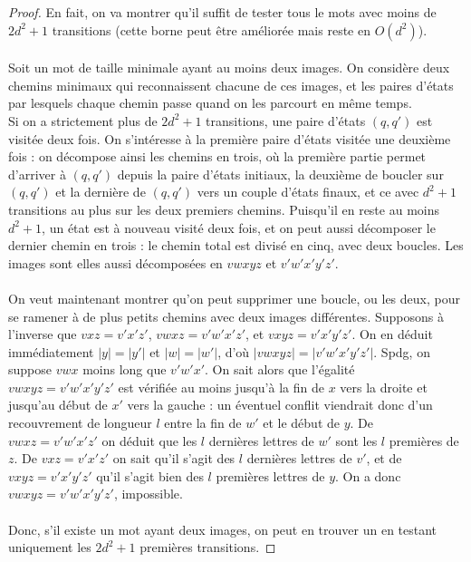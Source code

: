 \documentclass{scrartcl}
\begin{document}
\begin{flushleft}
\begin{proof}
    En fait, on va montrer qu'il suffit de tester tous le mots avec moins de $2d^2+1$ transitions (cette borne peut être améliorée
    mais reste en $O(d^2)$).
    \\~\\
    Soit un mot de taille minimale ayant au moins deux images. On considère deux chemins minimaux qui reconnaissent
    chacune de ces images, et les paires d'états par lesquels chaque chemin passe quand on les parcourt en même temps.\\
    Si on a strictement plus de $2d^2+1$ transitions, une paire d'états $(q,q')$ est visitée deux fois. On s'intéresse à la première paire
    d'états visitée une deuxième fois : on décompose ainsi les chemins en trois, où la première partie permet d'arriver à $(q, q')$
    depuis la paire d'états initiaux, la deuxième de boucler sur $(q,q')$ et la dernière de $(q,q')$ vers un couple d'états finaux, et ce
    avec $d^2+1$ transitions au plus sur les deux premiers chemins. Puisqu'il en reste au moins $d^2+1$, un état est à nouveau
    visité deux fois, et on peut aussi décomposer le dernier chemin en trois : le chemin total est divisé en cinq, avec deux boucles.
    Les images sont elles aussi décomposées en $vwxyz$ et $v'w'x'y'z'$.
    \\~\\
    On veut maintenant montrer qu'on peut supprimer une
    boucle, ou les deux, pour se ramener à de plus petits chemins avec deux images différentes. Supposons à l'inverse que
    $vxz=v'x'z'$, $vwxz=v'w'x'z'$, et $vxyz=v'x'y'z'$. On en déduit immédiatement $| y |= | y' |$ et $| w |=| w'|$,
    d'où $| vwxyz| = | v'w'x'y'z' |$. Spdg, on suppose $vwx$ moins long que $v'w'x'$. On sait alors que l'égalité
    $vwxyz=v'w'x'y'z'$ est vérifiée au moins jusqu'à la fin de $x$ vers la droite et jusqu'au début de $x'$ vers la gauche : un éventuel
    conflit viendrait donc d'un recouvrement de longueur $l$ entre la fin de $w'$ et le début de $y$. De $vwxz=v'w'x'z'$ on déduit
    que les $l$ dernières lettres de $w'$ sont les $l$ premières de $z$. De $vxz=v'x'z'$ on sait qu'il s'agit des $l$ dernières lettres de
    $v'$, et de $vxyz=v'x'y'z'$ qu'il s'agit bien des $l$ premières lettres de $y$. On a donc $vwxyz=v'w'x'y'z'$, impossible.
    \\~\\
    Donc, s'il existe un mot ayant deux images, on peut en trouver un en testant uniquement les $2d^2+1$ premières transitions.


\end{proof}
\end{flushleft}
\end{document}
